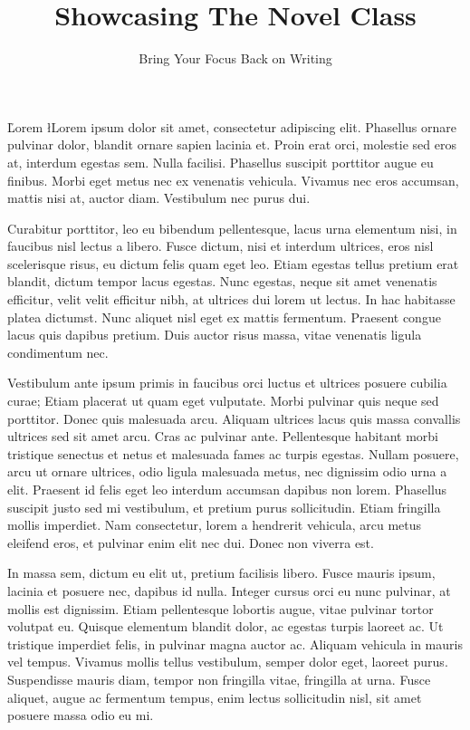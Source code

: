 \documentclass{novel}
\title     {Showcasing The Novel Class}
\subtitle  {Bring Your Focus Back on Writing}
\begin{document}
\toc

\h{Lorem}
\l{L}orem ipsum dolor sit amet, consectetur adipiscing elit. Phasellus ornare pulvinar dolor, blandit ornare sapien lacinia et. Proin erat orci, molestie sed eros at, interdum egestas sem. Nulla facilisi. Phasellus suscipit porttitor augue eu finibus. Morbi eget metus nec ex venenatis vehicula. Vivamus nec eros accumsan, mattis nisi at, auctor diam. Vestibulum nec purus dui.

Curabitur porttitor, leo eu bibendum pellentesque, lacus urna elementum nisi, in faucibus nisl lectus a libero. Fusce dictum, nisi et interdum ultrices, eros nisl scelerisque risus, eu dictum felis quam eget leo. Etiam egestas tellus pretium erat blandit, dictum tempor lacus egestas. Nunc egestas, neque sit amet venenatis efficitur, velit velit efficitur nibh, at ultrices dui lorem ut lectus. In hac habitasse platea dictumst. Nunc aliquet nisl eget ex mattis fermentum. Praesent congue lacus quis dapibus pretium. Duis auctor risus massa, vitae venenatis ligula condimentum nec.

Vestibulum ante ipsum primis in faucibus orci luctus et ultrices posuere cubilia curae; Etiam placerat ut quam eget vulputate. Morbi pulvinar quis neque sed porttitor. Donec quis malesuada arcu. Aliquam ultrices lacus quis massa convallis ultrices sed sit amet arcu. Cras ac pulvinar ante. Pellentesque habitant morbi tristique senectus et netus et malesuada fames ac turpis egestas. Nullam posuere, arcu ut ornare ultrices, odio ligula malesuada metus, nec dignissim odio urna a elit. Praesent id felis eget leo interdum accumsan dapibus non lorem. Phasellus suscipit justo sed mi vestibulum, et pretium purus sollicitudin. Etiam fringilla mollis imperdiet. Nam consectetur, lorem a hendrerit vehicula, arcu metus eleifend eros, et pulvinar enim elit nec dui. Donec non viverra est.

In massa sem, dictum eu elit ut, pretium facilisis libero. Fusce mauris ipsum, lacinia et posuere nec, dapibus id nulla. Integer cursus orci eu nunc pulvinar, at mollis est dignissim. Etiam pellentesque lobortis augue, vitae pulvinar tortor volutpat eu. Quisque elementum blandit dolor, ac egestas turpis laoreet ac. Ut tristique imperdiet felis, in pulvinar magna auctor ac. Aliquam vehicula in mauris vel tempus. Vivamus mollis tellus vestibulum, semper dolor eget, laoreet purus. Suspendisse mauris diam, tempor non fringilla vitae, fringilla at urna. Fusce aliquet, augue ac fermentum tempus, enim lectus sollicitudin nisl, sit amet posuere massa odio eu mi.
\end{document}
